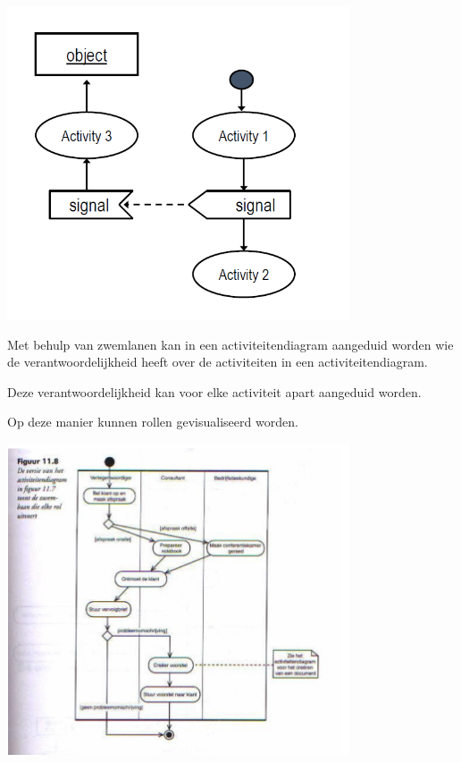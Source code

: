 \begin{center}
\includegraphics[width=4in]{img/signals}%
\end{center}


Met behulp van zwemlanen kan in een activiteitendiagram aangeduid worden wie de verantwoordelijkheid heeft over de activiteiten in een activiteitendiagram. 

Deze verantwoordelijkheid kan voor elke activiteit apart aangeduid worden. 

Op deze manier kunnen rollen gevisualiseerd worden.


\begin{center}
\includegraphics[width=4in]{img/swimlanes}%
\label{labelname}%
\end{center}

